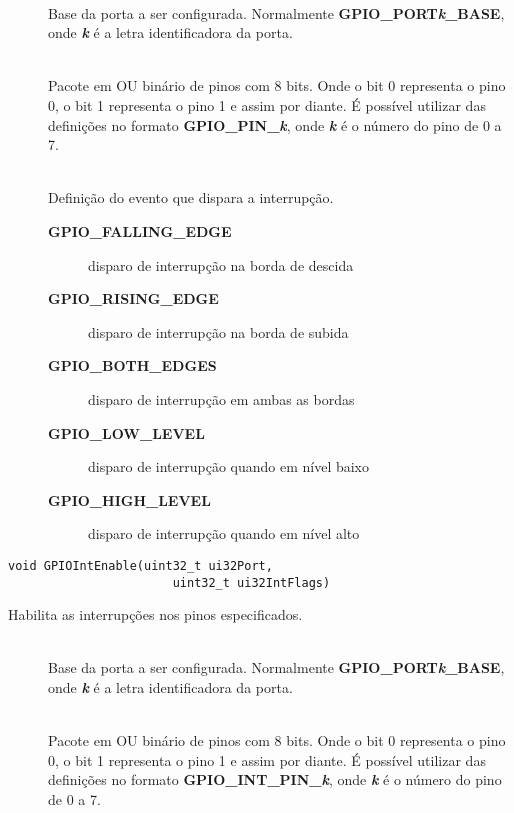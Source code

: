 \begin{description}
	\item []\hfill \\
	Base da porta a ser configurada. Normalmente \textbf{GPIO\_PORT\emph{k}\_BASE}, onde \textbf{\emph{k}} é a letra identificadora da porta.
	
	\item []\hfill \\
	Pacote em OU binário de pinos com 8 bits. Onde o bit 0 representa o pino 0, o bit 1 representa o pino 1 e assim por diante. É possível utilizar das definições no formato  \textbf{GPIO\_PIN\_\emph{k}}, onde \textbf{\emph{k}} é o número do pino de 0 a 7.
	
	\item []\hfill \\
	Definição do evento que dispara a interrupção.
	\begin{description}
		\item [\textbf{GPIO\_FALLING\_EDGE}] disparo de interrupção na borda de descida
		\item [\textbf{GPIO\_RISING\_EDGE}] disparo de interrupção na borda de subida
		\item [\textbf{GPIO\_BOTH\_EDGES}] disparo de interrupção em ambas as bordas
		\item [\textbf{GPIO\_LOW\_LEVEL}] disparo de interrupção quando em nível baixo
		\item [\textbf{GPIO\_HIGH\_LEVEL}] disparo de interrupção quando em nível alto
	\end{description}
\end{description}

\begin{lstlisting}[style=funcao]
	void GPIOIntEnable(uint32_t ui32Port,
					   uint32_t ui32IntFlags)
\end{lstlisting}

Habilita as interrupções nos pinos especificados.

\begin{description}
	\item []\hfill \\
	Base da porta a ser configurada. Normalmente \textbf{GPIO\_PORT\emph{k}\_BASE}, onde \textbf{\emph{k}} é a letra identificadora da porta.
	
	\item []\hfill \\
	Pacote em OU binário de pinos com 8 bits. Onde o bit 0 representa o pino 0, o bit 1 representa o pino 1 e assim por diante. É possível utilizar das definições no formato  \textbf{GPIO\_INT\_PIN\_\emph{k}}, onde \textbf{\emph{k}} é o número do pino de 0 a 7.
\end{description}

